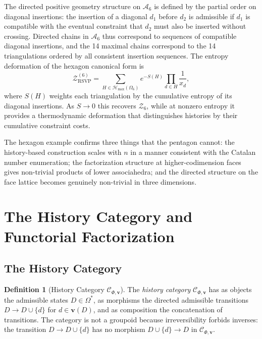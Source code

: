 \documentclass[12pt, oneside]{amsart}
\theoremstyle{plain}
\theoremstyle{definition}
\newtheorem{definition}[theorem]{Definition}
\theoremstyle{remark}
\newcommand{\Sf}{S}
\newcommand{\OmKS}{\Omega}
\newcommand{\Ccat}{\mathcal{C}_{\Phi,\mathbf{v}}}
\newcommand{\ZRSVP}{\mathcal{Z}_{\mathrm{RSVP}}}
\newcommand{\Hmax}{\mathcal{H}_{\max}}
\begin{document}
The directed positive geometry structure on $\mathcal{A}_6$ is defined by the partial order on diagonal insertions: the insertion of a diagonal $d_1$ before $d_2$ is admissible if $d_1$ is compatible with the eventual constraint that $d_2$ must also be inserted without crossing. Directed chains in $\mathcal{A}_6$ thus correspond to sequences of compatible diagonal insertions, and the 14 maximal chains correspond to the 14 triangulations ordered by all consistent insertion sequences. The entropy deformation of the hexagon canonical form is
\[
  \ZRSVP^{(6)} = \sum_{H \in \Hmax(\OmKS_6)} e^{-\Sf(H)} \prod_{d \in H} \frac{1}{x_d},
\]
where $\Sf(H)$ weights each triangulation by the cumulative entropy of its diagonal insertions. As $\Sf \to 0$ this recovers $\mathcal{Z}_6$, while at nonzero entropy it provides a thermodynamic deformation that distinguishes histories by their cumulative constraint costs.

The hexagon example confirms three things that the pentagon cannot: the history-based construction scales with $n$ in a manner consistent with the Catalan number enumeration; the factorization structure at higher-codimension faces gives non-trivial products of lower associahedra; and the directed structure on the face lattice becomes genuinely non-trivial in three dimensions.

\section{The History Category and Functorial Factorization}
\label{sec:categorical}

\subsection{The History Category}

\begin{definition}[History Category $\Ccat$]
The \emph{history category} $\Ccat$ has as objects the admissible states $D \in \OmKS^*$, as morphisms the directed admissible transitions $D \to D \cup \{d\}$ for $d \in \mathbf{v}(D)$, and as composition the concatenation of transitions. The category is not a groupoid because irreversibility forbids inverses: the transition $D \to D \cup \{d\}$ has no morphism $D \cup \{d\} \to D$ in $\Ccat$.
\end{definition}
\end{document}
